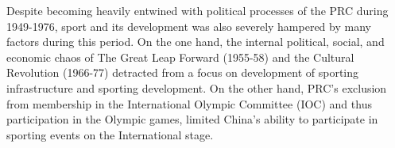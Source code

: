 {%

Despite becoming heavily entwined with political processes of the PRC during 1949-1976, sport and its development was also severely hampered by many factors during this period.  On the one hand, the internal political, social, and economic chaos of The Great Leap Forward (1955-58) and the Cultural Revolution (1966-77) detracted from a focus on development of sporting infrastructure and sporting development.  On the other hand, PRC's exclusion from membership in the International Olympic Committee (IOC) and thus participation in the Olympic games, limited China's ability to participate in sporting events on the International stage.

}
